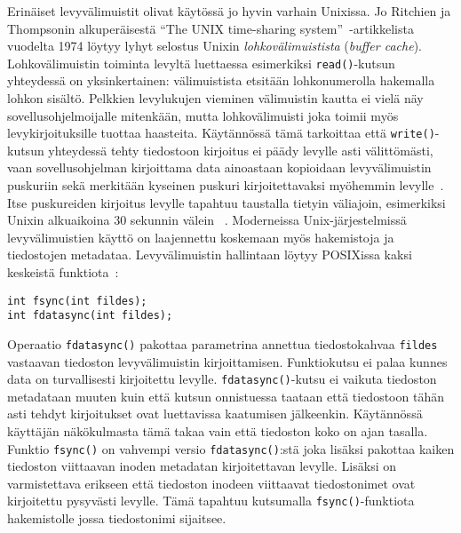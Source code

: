 Erinäiset levyvälimuistit olivat käytössä jo hyvin varhain Unixissa.
Jo Ritchien ja Thompsonin alkuperäisestä ``The UNIX time-sharing system''~\cite{UnixPaper}-artikkelista vuodelta 1974 löytyy lyhyt selostus Unixin \emph{lohkovälimuistista} (\emph{buffer cache}).
Lohkovälimuistin toiminta levyltä luettaessa esimerkiksi \texttt{read()}-kutsun yhteydessä on yksinkertainen:
välimuistista etsitään lohkonumerolla hakemalla lohkon sisältö.
Pelkkien levylukujen vieminen välimuistin kautta ei vielä näy sovellusohjelmoijalle mitenkään,
mutta lohkovälimuisti joka toimii myös levykirjoituksille tuottaa haasteita.
Käytännössä tämä tarkoittaa että \texttt{write()}-kutsun yhteydessä tehty tiedostoon kirjoitus ei päädy levylle asti välittömästi,
vaan sovellusohjelman kirjoittama data ainoastaan kopioidaan levyvälimuistin puskuriin sekä merkitään kyseinen puskuri kirjoitettavaksi myöhemmin levylle~\cite{UnixPaper}.
Itse puskureiden kirjoitus levylle tapahtuu taustalla tietyin väliajoin,
esimerkiksi Unixin alkuaikoina 30 sekunnin välein ~\cite{SpriteRosenblumThesis}.
Moderneissa Unix-järjestelmissä levyvälimuistien käyttö on laajennettu koskemaan myös hakemistoja ja tiedostojen metadataa.
%
%
Levyvälimuistin hallintaan löytyy POSIXissa kaksi keskeistä funktiota~\cite{PosixSpec}:
\begin{verbatim}
int fsync(int fildes);
int fdatasync(int fildes);
\end{verbatim}
%
Operaatio \texttt{fdatasync()} pakottaa parametrina annettua tiedostokahvaa \texttt{fildes} vastaavan tiedoston levyvälimuistin kirjoittamisen.
Funktiokutsu ei palaa kunnes data on turvallisesti kirjoitettu levylle.
\texttt{fdatasync()}-kutsu ei vaikuta tiedoston metadataan muuten kuin että kutsun onnistuessa taataan että tiedostoon tähän asti tehdyt kirjoitukset ovat luettavissa kaatumisen jälkeenkin.
Käytännössä käyttäjän näkökulmasta tämä takaa vain että tiedoston koko on ajan tasalla.
Funktio \texttt{fsync()} on vahvempi versio \texttt{fdatasync()}:stä joka lisäksi pakottaa kaiken tiedoston viittaavan inoden metadatan kirjoitettavan levylle.
Lisäksi on varmistettava erikseen että tiedoston inodeen viittaavat tiedostonimet ovat kirjoitettu pysyvästi levylle.
Tämä tapahtuu kutsumalla \texttt{fsync()}-funktiota hakemistolle jossa tiedostonimi sijaitsee.

